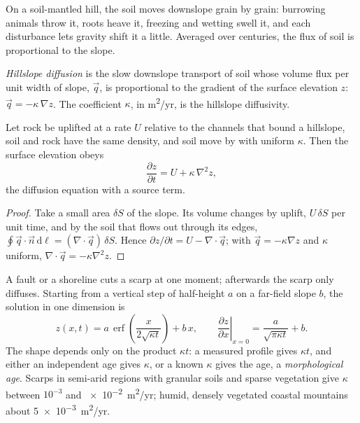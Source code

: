 On a soil-mantled hill, the soil moves downslope grain by grain: burrowing
animals throw it, roots heave it, freezing and wetting swell it, and each
disturbance lets gravity shift it a little. Averaged over centuries, the
flux of soil is proportional to the slope.

\begin{definition}\label{def:b3:quantitative-geomorphology:diffusion}
\emph{Hillslope diffusion} is the slow
downslope transport of soil whose volume flux per unit width of slope,
$\vec q$, is proportional to the gradient of the surface elevation $z$:
$\vec q = -\kappa\,\nabla z$. The coefficient $\kappa$, in
\unit{m^2/yr}, is the hillslope diffusivity.
\end{definition}

\begin{theorem}\label{thm:b3:quantitative-geomorphology:diffusion}
Let rock be uplifted at a rate $U$ relative to the channels that bound a
hillslope, soil and rock have the same density, and soil move by  with uniform $\kappa$. Then the surface elevation obeys
\[
\frac{\partial z}{\partial t} = U + \kappa\,\nabla^2 z ,
\]
the diffusion equation with a source term.
\end{theorem}

\begin{proof}
Take a small area $\delta S$ of the slope. Its volume changes by uplift,
$U\,\delta S$ per unit time, and by the soil that flows out through its
edges, $\oint \vec q\cdot\vec n\,\mathrm{d}\ell = (\nabla\cdot\vec q)\,\delta S$.
Hence $\partial z/\partial t = U - \nabla\cdot\vec q$; with $\vec q = -\kappa
\nabla z$ and $\kappa$ uniform, $\nabla\cdot\vec q = -\kappa\nabla^2 z$.
\end{proof}

A fault or a shoreline cuts a scarp at one moment; afterwards the scarp only
diffuses. Starting from a vertical step of half-height $a$ on a far-field
slope $b$, the solution in one dimension is
\[
z(x,t) = a\,\operatorname{erf}\!\left(\frac{x}{2\sqrt{\kappa t}}\right) + b\,x ,
\qquad
\left.\frac{\partial z}{\partial x}\right|_{x=0} = \frac{a}{\sqrt{\pi\kappa t}} + b .
\]
The shape depends only on the product $\kappa t$: a measured profile gives
$\kappa t$, and either an independent age gives $\kappa$, or a known
$\kappa$ gives the age, a \emph{morphological age}. Scarps in semi-arid
regions with granular soils and sparse vegetation give $\kappa$ between
$10^{-3}$ and \qty{e-2}{m^2/yr}; humid, densely vegetated coastal mountains
about \qty{5e-3}{m^2/yr}.

